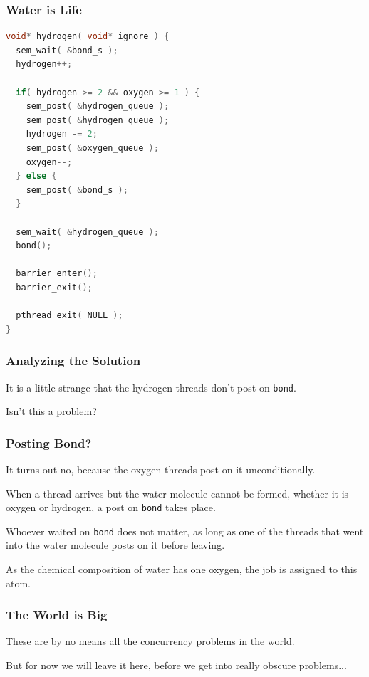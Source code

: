 \begin{frame}[fragile]
	\frametitle{Water is Life}
	\begin{lstlisting}[language=C]
void* hydrogen( void* ignore ) {
  sem_wait( &bond_s );
  hydrogen++;
  
  if( hydrogen >= 2 && oxygen >= 1 ) {
    sem_post( &hydrogen_queue );
    sem_post( &hydrogen_queue );
    hydrogen -= 2;
    sem_post( &oxygen_queue );
    oxygen--;
  } else {
    sem_post( &bond_s );
  }
  
  sem_wait( &hydrogen_queue );
  bond();
  
  barrier_enter();
  barrier_exit();
  
  pthread_exit( NULL );
}
\end{lstlisting}
\end{frame}


\begin{frame}
	\frametitle{Analyzing the Solution}


	It is a little strange that the hydrogen threads don't post on \texttt{bond}.

	Isn't this a problem?

\end{frame}


\begin{frame}
	\frametitle{Posting Bond?}

	It turns out no, because the oxygen threads post on it unconditionally.

	When a thread arrives but the water molecule cannot be formed, whether it is oxygen or hydrogen, a post on \texttt{bond} takes place.

	Whoever waited on \texttt{bond} does not matter, as long as one of the threads that went into the water molecule posts on it before leaving.

	As the chemical composition of water has one oxygen, the job is assigned to this atom.

\end{frame}



\begin{frame}
	\frametitle{The World is Big}

	These are by no means all the concurrency problems in the world.

	But for now we will leave it here, before  we get into really obscure problems...

\end{frame}



